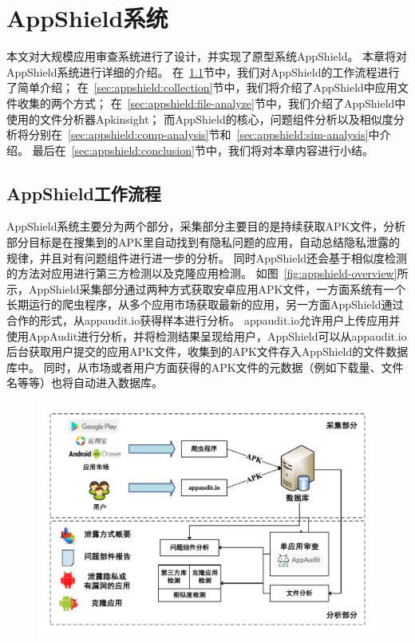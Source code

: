 \chapter{AppShield系统}
\label{chap:appshield}

本文对大规模应用审查系统进行了设计，并实现了原型系统AppShield。
本章将对AppShield系统进行详细的介绍。
在~\ref{sec:appshield:overview}节中，我们对AppShield的工作流程进行了简单介绍；
在~\ref{sec:appshield:collection}节中，我们将介绍了AppShield中应用文件收集的两个方式；
在~\ref{sec:appshield:file-analyze}节中，我们介绍了AppShield中使用的文件分析器Apkinsight；
而AppShield的核心，问题组件分析以及相似度分析将分别在~\ref{sec:appshield:comp-analysis}节和~\ref{sec:appshield:sim-analysis}中介绍。
最后在~\ref{sec:appshield:conclusion}节中，我们将对本章内容进行小结。

\section{AppShield工作流程}
\label{sec:appshield:overview}

AppShield系统主要分为两个部分，采集部分主要目的是持续获取APK文件，分析部分目标是在搜集到的APK里自动找到有隐私问题的应用，自动总结隐私泄露的规律，并且对有问题组件进行进一步的分析。
同时AppShield还会基于相似度检测的方法对应用进行第三方检测以及克隆应用检测。
如图~\ref{fig:appshield-overview}所示，AppShield采集部分通过两种方式获取安卓应用APK文件，一方面系统有一个长期运行的爬虫程序，从多个应用市场获取最新的应用，另一方面AppShield通过合作的形式，从appaudit.io获得样本进行分析。
appaudit.io允许用户上传应用并使用AppAudit进行分析，并将检测结果呈现给用户，AppShield可以从appaudit.io后台获取用户提交的应用APK文件，收集到的APK文件存入AppShield的文件数据库中。
同时，从市场或者用户方面获得的APK文件的元数据（例如下载量、文件名等等）也将自动进入数据库。

\begin{figure}
	\centering
	\includegraphics[width=1\textwidth]{figure/appshield-overview.pdf}
\end{figure}


